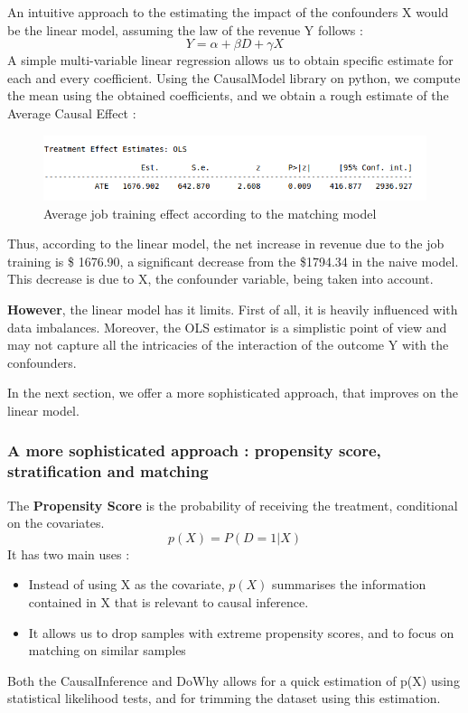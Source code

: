 \documentclass{article}
\begin{document}
An intuitive approach to the estimating the impact of the confounders X would be the linear model, assuming the law of the revenue Y follows :
$$ Y = \alpha + \beta D + \gamma X
$$
A simple multi-variable linear regression allows us to obtain specific estimate for each and every coefficient.
Using the CausalModel library on python, we compute the mean using the obtained coefficients, and we obtain a rough estimate of the Average Causal Effect : 

\begin{figure}[h]
\small
\centering
\includegraphics[width=0.8 \textwidth]{../figures/ate_linear_model.png}
\caption{Average job training effect according to the matching model}
\end{figure}



Thus, according to the linear model, the net increase in revenue due to the job training is \$ 1676.90, a significant decrease from the \$1794.34 in the naive model. This decrease is due to X, the confounder variable, being taken into account.

\textbf{However}, the linear model has it limits. First of all, it is heavily influenced with data imbalances. Moreover, the OLS estimator is a simplistic point of view and may not capture all the intricacies of the interaction of the outcome Y with the confounders.

In the next section, we offer a more sophisticated approach, that improves on the linear model.

\subsubsection{A more sophisticated approach : propensity score, stratification and matching}

The \textbf{Propensity Score} is the probability of receiving the treatment, conditional on the covariates.
$$ p(X) = P( D=1 \vert X )$$
It has two main uses : 
\begin{itemize}
    \item Instead of using X as the covariate, $p(X)$ summarises the information contained in X that is relevant to causal inference.
    \item It allows us to drop samples with extreme propensity scores, and to focus on matching on similar samples
\end{itemize}
Both the CausalInference and DoWhy allows for a quick estimation of p(X) using statistical likelihood tests, and for trimming the dataset using this estimation.
\end{document}
